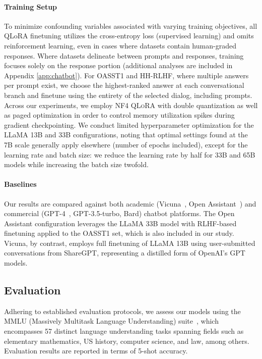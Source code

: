 \paragraph{Training Setup} To minimize confounding variables associated with varying training objectives, all QLoRA finetuning utilizes the cross-entropy loss (supervised learning) and omits reinforcement learning, even in cases where datasets contain human-graded responses. Where datasets delineate between prompts and responses, training focuses solely on the response portion (additional analyses are included in Appendix \ref{app:chatbot}). For OASST1 and HH-RLHF, where multiple answers per prompt exist, we choose the highest-ranked answer at each conversational branch and finetune using the entirety of the selected dialog, including prompts. Across our experiments, we employ NF4 \textsc{QLoRA} with double quantization as well as paged optimization in order to control memory utilization spikes during gradient checkpointing. We conduct limited hyperparameter optimization for the LLaMA 13B and 33B configurations, noting that optimal settings found at the 7B scale generally apply elsewhere (number of epochs included), except for the learning rate and batch size: we reduce the learning rate by half for 33B and 65B models while increasing the batch size twofold.

\paragraph{Baselines} Our results are compared against both academic (Vicuna~\citep{vicuna2023}, Open Assistant~\citep{kopf2023openassistant}) and commercial (GPT-4~\citep{openai2023gpt}, GPT-3.5-turbo, Bard) chatbot platforms. The Open Assistant configuration leverages the LLaMA 33B model with RLHF-based finetuning applied to the OASST1 set, which is also included in our study. Vicuna, by contrast, employs full finetuning of LLaMA 13B using user-submitted conversations from ShareGPT, representing a distilled form of OpenAI’s GPT models.

\subsection{Evaluation}

Adhering to established evaluation protocols, we assess our models using the MMLU (Massively Multitask Language Understanding) suite~\citep{hendrycksmeasuring}, which encompasses 57 distinct language understanding tasks spanning fields such as elementary mathematics, US history, computer science, and law, among others. Evaluation results are reported in terms of 5-shot accuracy.

